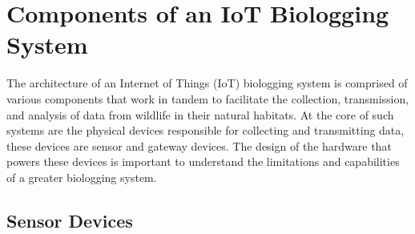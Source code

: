\documentclass[sigplan,screen,nonacm]{acmart}
\begin{document}
\section{Components of an IoT Biologging System}
\label{sec:Components of a IoT Biologging Device}

The architecture of an Internet of Things (IoT) biologging system is comprised of various 
components that work in tandem to facilitate the collection, transmission, and analysis of data from 
wildlife in their natural habitats. At the core of such systems are the physical devices responsible 
for collecting and transmitting data, these devices are sensor and gateway devices. The design 
of the hardware that powers these devices is important to understand the limitations and capabilities 
of a greater biologging system.

\subsection{Sensor Devices}
\label{subsec:Sensor Devices}
\end{document}
